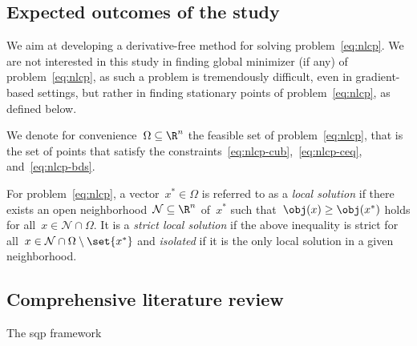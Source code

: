 \subsection{Expected outcomes of the study}

We aim at developing a derivative-free method for solving problem~\eqref{eq:nlcp}.
We are not interested in this study in finding global minimizer (if any) of problem~\eqref{eq:nlcp}, as such a problem is tremendously difficult, even in gradient-based settings, but rather in finding stationary points of problem~\eqref{eq:nlcp}, as defined below.

We denote for convenience~$\Omega \subseteq \R^n$ the feasible set of problem~\eqref{eq:nlcp}, that is the set of points that satisfy the constraints~\eqref{eq:nlcp-cub},~\eqref{eq:nlcp-ceq}, and~\eqref{eq:nlcp-bds}.

\begin{definition}
    For problem~\eqref{eq:nlcp}, a vector~$x^{\ast} \in \Omega$ is referred to as a \emph{local solution} if there exists an open neighborhood~$\mathcal{N} \subseteq \R^n$ of~$x^{\ast}$ such that~$\obj(x) \ge \obj(x^{\ast})$ holds for all~$x \in \mathcal{N} \cap \Omega$.
    It is a \emph{strict local solution} if the above inequality is strict for all~$x \in \mathcal{N} \cap \Omega \setminus \set{x^{\ast}}$ and \emph{isolated} if it is the only local solution in a given neighborhood.
\end{definition}


\subsection{Comprehensive literature review}

The \gls{sqp} framework~\cite{Han_1976,Han_1977,Powell_1978a,Powell_1978b,Wilson_1963}
